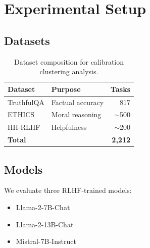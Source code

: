 \section{Experimental Setup}

\subsection{Datasets}

\begin{table}[h]
\centering
\begin{tabular}{@{}llr@{}}
\toprule
Dataset & Purpose & Tasks \\
\midrule
TruthfulQA & Factual accuracy & 817 \\
ETHICS & Moral reasoning & $\sim$500 \\
HH-RLHF & Helpfulness & $\sim$200 \\
\midrule
\textbf{Total} & & \textbf{2,212} \\
\bottomrule
\end{tabular}
\caption{Dataset composition for calibration clustering analysis.}
\label{tab:datasets}
\end{table}

\subsection{Models}

We evaluate three RLHF-trained models:

\begin{itemize}
    \item Llama-2-7B-Chat
    \item Llama-2-13B-Chat
    \item Mistral-7B-Instruct
\end{itemize}
